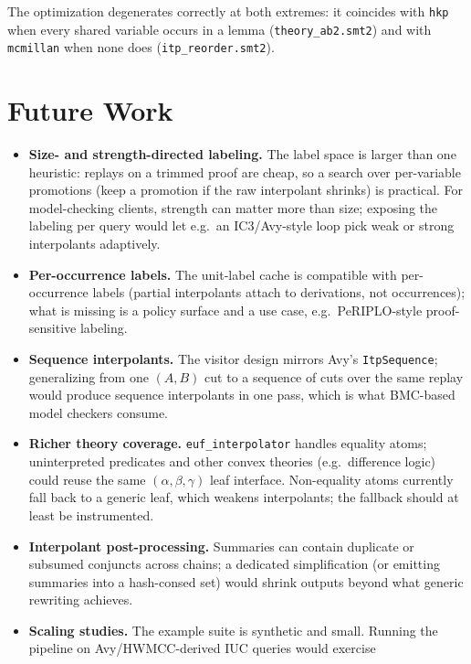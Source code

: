 \documentclass[11pt]{article}
\newcommand{\opt}[1]{\texttt{#1}}
\newcommand{\code}[1]{\texttt{#1}}
\begin{document}
The optimization degenerates correctly at both extremes: it coincides with
\opt{hkp} when every shared variable occurs in a lemma
(\code{theory\_ab2.smt2}) and with \opt{mcmillan} when none does
(\code{itp\_reorder.smt2}).

\section{Future Work}
\label{sec:future}

\begin{itemize}
\item \textbf{Size- and strength-directed labeling.} The label space is
      larger than one heuristic: replays on a trimmed proof are cheap, so a
      search over per-variable promotions (keep a promotion if the raw
      interpolant shrinks) is practical. For model-checking clients,
      strength can matter more than size; exposing the labeling per query
      would let e.g.\ an IC3/Avy-style loop pick weak or strong
      interpolants adaptively.
\item \textbf{Per-occurrence labels.} The unit-label cache is compatible
      with per-occurrence labels (partial interpolants attach to
      derivations, not occurrences); what is missing is a policy surface
      and a use case, e.g.\ PeRIPLO-style proof-sensitive labeling.
\item \textbf{Sequence interpolants.} The visitor design mirrors Avy's
      \code{ItpSequence}; generalizing from one $(A,B)$ cut to a sequence
      of cuts over the same replay would produce sequence interpolants in
      one pass, which is what BMC-based model checkers consume.
\item \textbf{Richer theory coverage.} \code{euf\_interpolator} handles
      equality atoms; uninterpreted predicates and other convex theories
      (e.g.\ difference logic) could reuse the same
      $(\alpha,\beta,\gamma)$ leaf interface. Non-equality atoms currently
      fall back to a generic leaf, which weakens interpolants; the
      fallback should at least be instrumented.
\item \textbf{Interpolant post-processing.} Summaries can contain
      duplicate or subsumed conjuncts across chains; a dedicated
      simplification (or emitting summaries into a hash-consed set) would
      shrink outputs beyond what generic rewriting achieves.
\item \textbf{Scaling studies.} The example suite is synthetic and small.
      Running the pipeline on Avy/HWMCC-derived IUC queries would exercise

\end{itemize}
\end{document}
